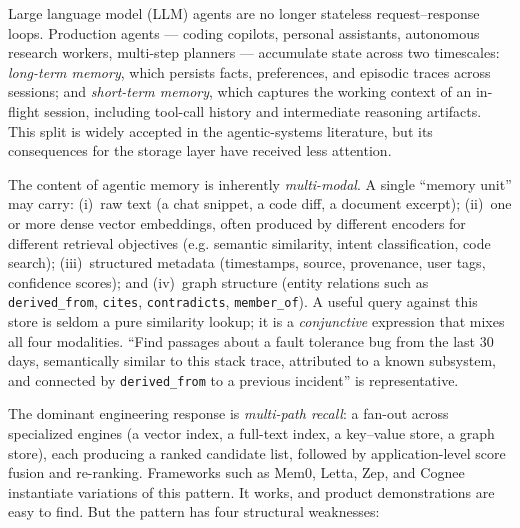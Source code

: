 \documentclass[acmsmall,review,anonymous]{acmart}
\theoremstyle{plain}
\theoremstyle{definition}
\theoremstyle{remark}
\begin{document}
Large language model (LLM) agents are no longer stateless
request--response loops. Production agents --- coding copilots, personal
assistants, autonomous research workers, multi-step planners ---
accumulate state across two timescales: \emph{long-term memory}, which
persists facts, preferences, and episodic traces across sessions; and
\emph{short-term memory}, which captures the working context of an
in-flight session, including tool-call history and intermediate
reasoning artifacts. This split is widely accepted in the
agentic-systems literature, but its consequences for the storage layer
have received less attention.

The content of agentic memory is inherently \emph{multi-modal}. A
single ``memory unit'' may carry: (i)~raw text (a chat snippet, a code
diff, a document excerpt); (ii)~one or more dense vector embeddings,
often produced by different encoders for different retrieval objectives
(e.g. semantic similarity, intent classification, code search);
(iii)~structured metadata (timestamps, source, provenance, user tags,
confidence scores); and (iv)~graph structure (entity relations such as
\texttt{derived\_from}, \texttt{cites}, \texttt{contradicts},
\texttt{member\_of}). A useful query against this store is seldom a pure
similarity lookup; it is a \emph{conjunctive} expression that mixes all
four modalities. ``Find passages about a fault tolerance bug from the
last 30 days, semantically similar to this stack trace, attributed to a
known subsystem, and connected by \texttt{derived\_from} to a previous
incident'' is representative.

The dominant engineering response is \emph{multi-path recall}: a
fan-out across specialized engines (a vector index, a full-text index,
a key--value store, a graph store), each producing a ranked candidate
list, followed by application-level score fusion and re-ranking.
Frameworks such as Mem0, Letta, Zep, and Cognee instantiate variations
of this pattern. It works, and product demonstrations are easy to find.
But the pattern has four structural weaknesses:
\end{document}
